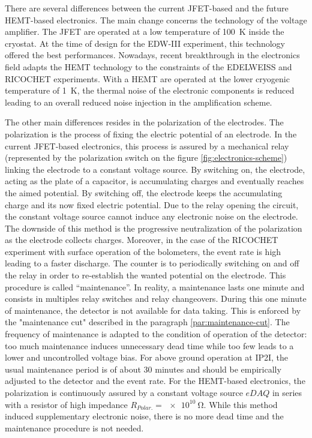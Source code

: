 There are several differences between the current JFET-based and the future HEMT-based electronics.
The main change concerns the technology of the voltage amplifier. The JFET are operated at a low temperature of \SI{100}{\kelvin} inside the cryostat. At the time of design for the EDW-III experiment, this technology offered the best performances. Nowadays, recent breakthrough in the electronics field adapts the HEMT technology to the constraints of the EDELWEISS and RICOCHET experiments. With a HEMT are operated at the lower cryogenic temperature of \SI{1}{\kelvin}, the thermal noise of the electronic components is reduced leading to an overall reduced noise injection in the amplification scheme.

The other main differences resides in the polarization of the electrodes. The polarization is the process of fixing the electric potential of an electrode.
In the current JFET-based electronics, this process is assured by a mechanical relay (represented by the polarization switch on the figure \ref{fig:electronics-scheme}) linking the electrode to a constant voltage source. By switching on, the electrode, acting as the plate of a capacitor, is accumulating charges and eventually reaches the aimed potential. By switching off, the electrode keeps the accumulating charge and its now fixed electric potential. Due to the relay opening the circuit, the constant voltage source cannot induce any electronic noise on the electrode.
The downside of this method is the progressive neutralization of the polarization as the electrode collects charges. Moreover, in the case of the RICOCHET experiment with surface operation of the bolometers, the event rate is high leading to a faster discharge.
The counter is to periodically switching on and off the relay in order to re-establish the wanted potential on the electrode. This procedure is called “maintenance”. In reality, a maintenance lasts one minute and consists in multiples relay switches and relay changeovers. During this one minute of maintenance, the detector is not available for data taking. This is enforced by the "maintenance cut" described in the paragraph \ref{par:maintenance-cut}. The frequency of maintenance is adapted to the condition of operation of the detector: too much maintenance induces unnecessary dead time while too few leads to a lower and uncontrolled voltage bias. For above ground operation at IP2I, the usual maintenance period is of about 30 minutes and should be empirically adjusted to the detector and the event rate.
For the HEMT-based electronics, the polarization is continuously assured by a constant voltage source $eDAQ$ in series with a resistor of high impedance $R_{Polar.} = \SI{e10}{\ohm}$. While this method induced supplementary electronic noise, there is no more dead time and the maintenance procedure is not needed.

